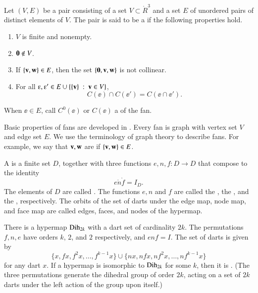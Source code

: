\documentclass{llncs}
\def\op#1{{\hbox{#1}}}
\begin{document}
\begin{definition}\label{def:fan}
Let $(V,E)$ be a pair consisting of a set $V\subset \ring{R}^3$ and
a set $E$ of unordered pairs of distinct elements of $V$.  The pair
is said to be a  if the following properties hold.
\begin{enumerate}
\item {} $V$ is finite and  nonempty.
\item {} ${\mathbf 0}\not\in V$.
\item {} If $\{{\mathbf v},{\mathbf w}\} \in E$, then the set
$\{{\mathbf 0},{\mathbf v},{\mathbf w}\}$ is not collinear.
\item {}
For all $\ee ,\ee '\in E \cup \{\{\v\}\mid \v\in V\}$, 
\[ C(\ee )\cap C(\ee ') = C(\ee \cap \ee
').\] 
\end{enumerate}
When $\ee\in E$, call $C^0(\ee)$ or $C(\ee)$ a 
of the fan.  
\end{definition}

Basic properties of fans are developed in \cite[Ch.~5]{DSP}.
Every fan is graph with vertex set $V$ and edge set $E$.
We use the terminology of graph theory to describe fans.  For example,
we say that ${\mathbf v},{\mathbf w}$ are  if $\{{\mathbf v},{\mathbf w}\}\in E$.


\begin{definition}[hypermap]   A  is a finite set $D$, together with three functions
  $e,n,f:D\to D$ that compose to the identity
  \[ 
e\ocirc n\ocirc f = I_D.
\]  The
elements of $D$ are called .  The functions $e,n$ and
$f$ are called the , the , and
the , respectively. 
The orbits of the set of darts under the edge map, node map, and face map are called edges, faces, and nodes of the hypermap.
\end{definition}

\begin{example}[dihedral]\label{ex:D2k} 
\formaldef{$\op{Dih}_{2k}$}{cyclic\_hypermap}
There is a hypermap $\op{Dih}_{2k}$ with a dart set of cardinality $2k$.
The permutations $f,n,e$ have  orders $k$, $2$, and $2$ respectively, and 
$e n f = I$.
The set of darts is given by
\[ 
\{x, f x,f^2 x,\ldots,f^{k-1} x\}\cup \{n x, n f x, n f^2 x,\ldots, n f^{k-1} x\}
\] 
for any dart $x$.
If a hypermap is isomorphic to $\op{Dih}_{2k}$ for
some $k$, then it is .
(The three permutations generate the dihedral
group of order $2k$, acting on a set of $2k$ darts under the left action of the group upon itself.) 
%
\end{example}
\end{document}
